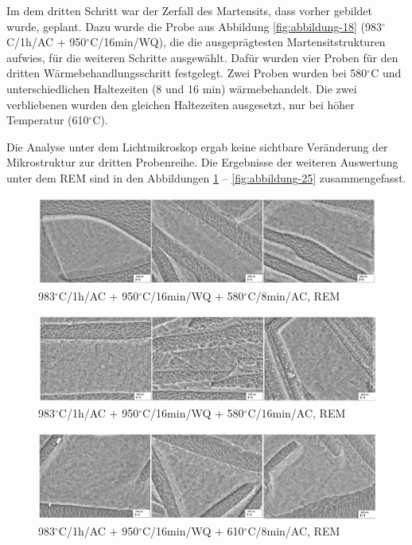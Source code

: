 Im dem dritten Schritt war der Zerfall des Martensits, dass vorher gebildet wurde, geplant. Dazu wurde die Probe aus Abbildung \ref{fig:abbildung-18} (983$^\circ$C/1h/AC + 950$^\circ$C/16min/WQ), die die ausgeprägtesten Martensitstrukturen aufwies, für die weiteren Schritte ausgewählt. 
Dafür wurden vier Proben für den dritten Wärmebehandlungsschritt festgelegt. Zwei Proben wurden bei 580$^\circ$C und unterschiedlichen Haltezeiten (8 und 16 min) wärmebehandelt. Die zwei verbliebenen wurden den gleichen Haltezeiten ausgesetzt, nur bei höher Temperatur (610$^\circ$C).

Die Analyse unter dem Lichtmikroskop ergab keine sichtbare Veränderung der Mikrostruktur zur dritten Probenreihe. Die Ergebnisse der weiteren Auswertung unter dem REM sind in den Abbildungen \ref{fig:abbildung-22} -- \ref{fig:abbildung-25} zusammengefasst.

\begin{figure}
	\centering
	\includegraphics[width=1.0\linewidth]{./Bilder/Abbildung 22.png}
	\caption[Abbildung 22]{983$^\circ$C/1h/AC + 950$^\circ$C/16min/WQ + 580$^\circ$C/8min/AC, REM}
	\label{fig:abbildung-22}
\end{figure}

\begin{figure}
	\centering
	\includegraphics[width=1.0\linewidth]{./Bilder/Abbildung 23.png}
	\caption[Abbildung 23]{983$^\circ$C/1h/AC + 950$^\circ$C/16min/WQ + 580$^\circ$C/16min/AC, REM}
	\label{fig:abbildung-23}
\end{figure}

\begin{figure}
	\centering
	\includegraphics[width=1.0\linewidth]{./Bilder/Abbildung 24.png}
	\caption[Abbildung 24]{983$^\circ$C/1h/AC + 950$^\circ$C/16min/WQ + 610$^\circ$C/8min/AC, REM}
	\label{fig:abbildung-24}
\end{figure}

